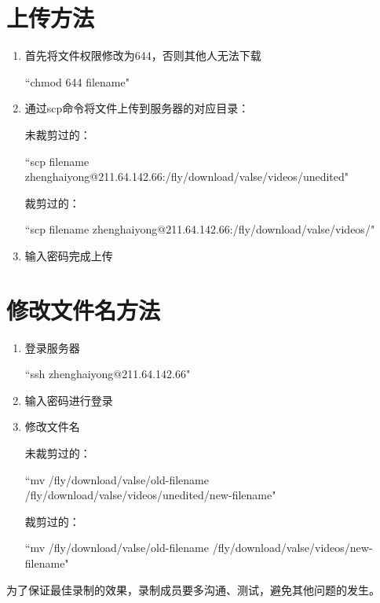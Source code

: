 \documentclass[12pt]{article}
\begin{document}
\section{上传方法}
\begin{enumerate}
 \item 首先将文件权限修改为644，否则其他人无法下载

   ``chmod 644 filename"

 \item 通过scp命令将文件上传到服务器的对应目录：

{\color{blue}未裁剪过的：}

  ``scp filename zhenghaiyong@211.64.142.66:/fly/download/valse/videos/unedited"

{\color{blue}裁剪过的：}

  ``scp filename zhenghaiyong@211.64.142.66:/fly/download/valse/videos/"

 \item 输入密码完成上传

\end{enumerate}

\section{修改文件名方法}
\begin{enumerate}
 \item 登录服务器

``ssh zhenghaiyong@211.64.142.66"

 \item 输入密码进行登录

 \item 修改文件名

{\color{blue}未裁剪过的：}

  ``mv /fly/download/valse/old-filename /fly/download/valse/videos/unedited/new-filename"

{\color{blue}裁剪过的：}

  ``mv /fly/download/valse/old-filename /fly/download/valse/videos/new-filename"
\end{enumerate}

{\color{red}为了保证最佳录制的效果，录制成员要多沟通、测试，避免其他问题的发生。}
\end{document}
